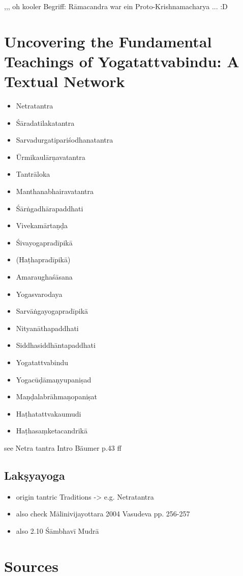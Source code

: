 {,,, oh kooler Begriff: Rāmacandra war ein Proto-Krishnamacharya ... :D 


\chapter{Uncovering the Fundamental Teachings of Yogatattvabindu: A Textual Network}

\begin{itemize}
\item Netratantra
\item Śāradatilakatantra
\item Sarvadurgatipariśodhanatantra
\item Ūrmikaulārṇavatantra
\item Tantrāloka
\item Manthanabhairavatantra
\item Śārṅgadhārapaddhati 
\item Vivekamārtaṇḍa
\item Śivayogapradīpikā
\item (Haṭhapradīpikā)
\item Amaraughaśāsana
\item Yogasvarodaya
\item Sarvāṅgayogapradīpikā
\item Nityanāthapaddhati  
\item Siddhasiddhāntapaddhati
\item Yogatattvabindu 
\item Yogacūḍāmaṇyupaniṣad
\item Maṇḍalabrāhmaṇopaniṣat
\item Haṭhatattvakaumudi
\item Haṭhasaṃketacandrikā
\end{itemize}

see Netra tantra Intro Bäumer p.43 ff

\section{Lakṣyayoga}

\begin{itemize}
\item origin tantric Traditions -> e.g. Netratantra
\item also check Mālinivijayottara 2004 Vasudeva pp. 256-257
\item also  2.10 Śāmbhavī Mudrā
  \end{itemize} 

\chapter{Sources}
}
